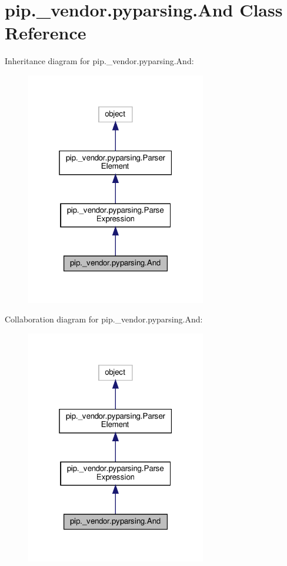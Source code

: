 \hypertarget{classpip_1_1__vendor_1_1pyparsing_1_1And}{}\section{pip.\+\_\+vendor.\+pyparsing.\+And Class Reference}
\label{classpip_1_1__vendor_1_1pyparsing_1_1And}


Inheritance diagram for pip.\+\_\+vendor.\+pyparsing.\+And\+:
\nopagebreak
\begin{figure}[H]
\begin{center}
\leavevmode
\includegraphics[width=223pt]{classpip_1_1__vendor_1_1pyparsing_1_1And__inherit__graph}
\end{center}
\end{figure}


Collaboration diagram for pip.\+\_\+vendor.\+pyparsing.\+And\+:
\nopagebreak
\begin{figure}[H]
\begin{center}
\leavevmode
\includegraphics[width=223pt]{classpip_1_1__vendor_1_1pyparsing_1_1And__coll__graph}
\end{center}
\end{figure}
